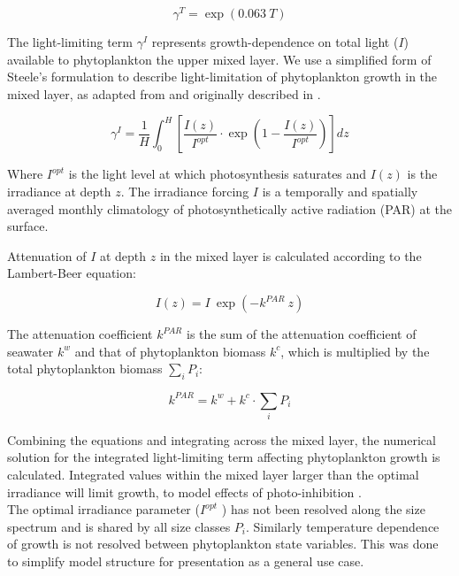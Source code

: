\documentclass[template.tex]{subfiles}
\begin{document}
\begin{equation}
    \gamma^{T} = \exp{(0.063 \ T)} \label{mumax}
\end{equation}

The light-limiting term $\gamma^{I}$ represents growth-dependence on total light ($I$) available to phytoplankton the upper mixed layer. We use a simplified form of Steele's formulation to describe light-limitation of phytoplankton growth in the mixed layer, as adapted from \citet{Acevedo-Trejos2016} and originally described in \citet{Steele1962EnvironmentalSea}.

\begin{equation}
    \gamma^{I} = \frac{1}{H} \int_{0}^{H}\left[ \frac{I(z)}{I^{opt}} \cdot \exp{\left( 1 - \frac{I(z)}{I^{opt}} \right) }  \right]dz \label{steele}
\end{equation}

Where $I^{opt}$ is the light level at which photosynthesis saturates and $I(z)$ is the irradiance at depth $z$.
The irradiance forcing $I$ is a temporally and spatially averaged monthly climatology of photosynthetically active radiation (PAR) at the surface. 

Attenuation of $I$ at depth $z$ in the mixed layer is calculated according to the Lambert-Beer equation:

\begin{equation}
    I(z) = I \ \exp{(-k^{PAR} \ z)} \label{beer}
\end{equation}

The attenuation coefficient $k^{PAR}$ is the sum of the attenuation coefficient of seawater $k^w$ and that of phytoplankton biomass $k^c$, which is multiplied by the total phytoplankton biomass $\sum_i P_i$:

\begin{equation}
    k^{PAR} = k^w + k^c \cdot \sum_i P_i
\end{equation}

Combining the equations and integrating across the mixed layer, the numerical solution for the integrated light-limiting term affecting phytoplankton growth is calculated. Integrated values within the mixed layer larger than the optimal irradiance will limit growth, to model effects of photo-inhibition \citep{Steele1962EnvironmentalSea}.\\

The optimal irradiance parameter ($I^{opt}$ ) has not been resolved along the size spectrum and is shared by all size classes $P_i$. Similarly temperature dependence of growth is not resolved between phytoplankton state variables. This was done to simplify model structure for presentation as a general use case. \\
\end{document}
